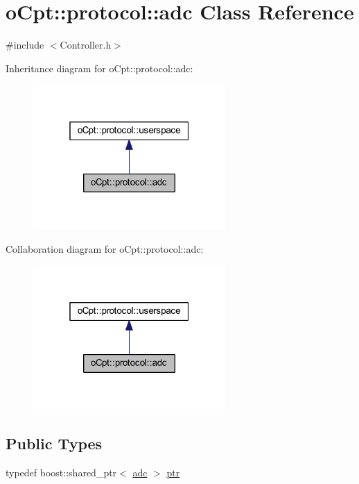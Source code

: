 \hypertarget{classo_cpt_1_1protocol_1_1adc}{}\section{o\+Cpt\+:\+:protocol\+:\+:adc Class Reference}
\label{classo_cpt_1_1protocol_1_1adc}


{\ttfamily \#include $<$Controller.\+h$>$}



Inheritance diagram for o\+Cpt\+:\+:protocol\+:\+:adc\+:\nopagebreak
\begin{figure}[H]
\begin{center}
\leavevmode
\includegraphics[width=208pt]{classo_cpt_1_1protocol_1_1adc__inherit__graph}
\end{center}
\end{figure}


Collaboration diagram for o\+Cpt\+:\+:protocol\+:\+:adc\+:\nopagebreak
\begin{figure}[H]
\begin{center}
\leavevmode
\includegraphics[width=208pt]{classo_cpt_1_1protocol_1_1adc__coll__graph}
\end{center}
\end{figure}
\subsection*{Public Types}
\begin{DoxyCompactItemize}
\item 
typedef boost\+::shared\+\_\+ptr$<$ \hyperlink{classo_cpt_1_1protocol_1_1adc}{adc} $>$ \hyperlink{classo_cpt_1_1protocol_1_1adc_a94af68cb9c573629a4a1a16f8ebd3dff}{ptr}
\end{DoxyCompactItemize}
